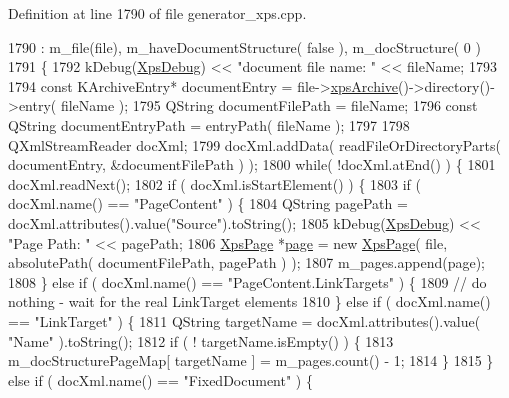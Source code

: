 Definition at line 1790 of file generator\+\_\+xps.\+cpp.


\begin{DoxyCode}
1790                                                               : m\_file(file), m\_haveDocumentStructure( \textcolor{keyword}{
      false} ), m\_docStructure( 0 )
1791 \{
1792     kDebug(\hyperlink{generator__xps_8cpp_a00c0825a8bf77ed142d9a5a205d66f3c}{XpsDebug}) << \textcolor{stringliteral}{"document file name: "} << fileName;
1793 
1794     \textcolor{keyword}{const} KArchiveEntry* documentEntry = file->\hyperlink{classXpsFile_a13a633163a15934693b3c65eae2a0c4f}{xpsArchive}()->directory()->entry( fileName );
1795     QString documentFilePath = fileName;
1796     \textcolor{keyword}{const} QString documentEntryPath = entryPath( fileName );
1797 
1798     QXmlStreamReader docXml;
1799     docXml.addData( readFileOrDirectoryParts( documentEntry, &documentFilePath ) );
1800     \textcolor{keywordflow}{while}( !docXml.atEnd() ) \{
1801         docXml.readNext();
1802         \textcolor{keywordflow}{if} ( docXml.isStartElement() ) \{
1803             \textcolor{keywordflow}{if} ( docXml.name() == \textcolor{stringliteral}{"PageContent"} ) \{
1804                 QString pagePath = docXml.attributes().value(\textcolor{stringliteral}{"Source"}).toString();
1805                 kDebug(\hyperlink{generator__xps_8cpp_a00c0825a8bf77ed142d9a5a205d66f3c}{XpsDebug}) << \textcolor{stringliteral}{"Page Path: "} << pagePath;
1806                 \hyperlink{classXpsPage}{XpsPage} *\hyperlink{classXpsDocument_af6444d5bca4ad1b5b7de6e9b92221991}{page} = \textcolor{keyword}{new} \hyperlink{classXpsPage}{XpsPage}( file, absolutePath( documentFilePath, 
      pagePath ) );
1807                 m\_pages.append(page);
1808             \} \textcolor{keywordflow}{else} \textcolor{keywordflow}{if} ( docXml.name() == \textcolor{stringliteral}{"PageContent.LinkTargets"} ) \{
1809                 \textcolor{comment}{// do nothing - wait for the real LinkTarget elements}
1810             \} \textcolor{keywordflow}{else} \textcolor{keywordflow}{if} ( docXml.name() == \textcolor{stringliteral}{"LinkTarget"} ) \{
1811                 QString targetName = docXml.attributes().value( \textcolor{stringliteral}{"Name"} ).toString();
1812                 \textcolor{keywordflow}{if} ( ! targetName.isEmpty() ) \{
1813                     m\_docStructurePageMap[ targetName ] = m\_pages.count() - 1;
1814                 \}
1815             \} \textcolor{keywordflow}{else} \textcolor{keywordflow}{if} ( docXml.name() == \textcolor{stringliteral}{"FixedDocument"} ) \{

\end{DoxyCode}
